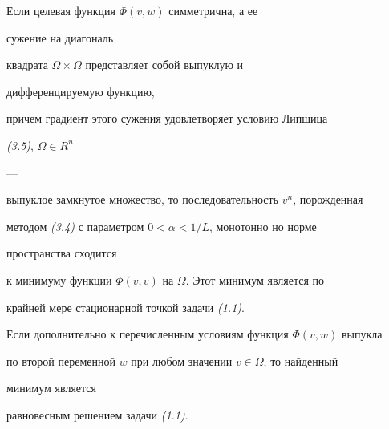 \begin{thm} Если целевая функция $\Phi(v,w)$ симметрична, а ее


сужение на диагональ


квадрата $\Omega\times\Omega$ представляет собой выпуклую и


дифференцируемую функцию,


причем градиент этого сужения удовлетворяет условию Липшица


{\em (3.5)}, $\Omega\in R^n$


---


выпуклое замкнутое множество, то последовательность $v^n$, порожденная


методом {\em (3.4)} с параметром $0<\alpha<1/L$, монотонно но норме


пространства сходится


к минимуму функции $\Phi(v,v)$ на $\Omega$. Этот минимум является по


крайней мере стационарной точкой задачи {\em (1.1)}.





Если дополнительно к перечисленным условиям функция $\Phi(v,w)$ выпукла


по второй переменной $w$ при любом значении $v\in\Omega$, то найденный


минимум является


равновесным решением задачи {\em (1.1)}.


\end{thm}





